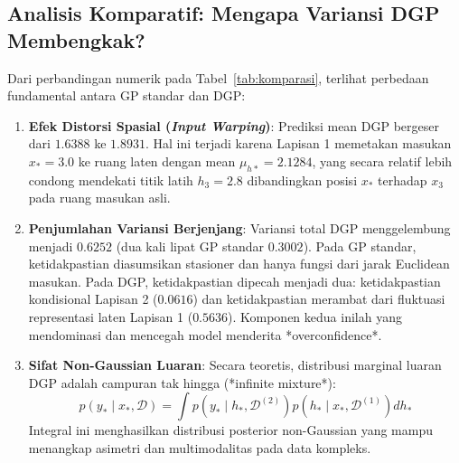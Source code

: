 \documentclass[11pt,a4paper]{article}
\begin{document}
\subsection{Analisis Komparatif: Mengapa Variansi DGP Membengkak?}
Dari perbandingan numerik pada Tabel~\ref{tab:komparasi}, terlihat perbedaan fundamental antara GP standar dan DGP:
\begin{enumerate}
    \item \textbf{Efek Distorsi Spasial (\textit{Input Warping})}: Prediksi mean DGP bergeser dari $1.6388$ ke $\mathbf{1.8931}$. Hal ini terjadi karena Lapisan 1 memetakan masukan $x_* = 3.0$ ke ruang laten dengan mean $\mu_{h*} = 2.1284$, yang secara relatif lebih condong mendekati titik latih $h_3 = 2.8$ dibandingkan posisi $x_*$ terhadap $x_3$ pada ruang masukan asli.
    \item \textbf{Penjumlahan Variansi Berjenjang}: Variansi total DGP menggelembung menjadi $\mathbf{0.6252}$ (dua kali lipat GP standar $0.3002$). Pada GP standar, ketidakpastian diasumsikan stasioner dan hanya fungsi dari jarak Euclidean masukan. Pada DGP, ketidakpastian dipecah menjadi dua: ketidakpastian kondisional Lapisan 2 ($0.0616$) dan ketidakpastian merambat dari fluktuasi representasi laten Lapisan 1 ($\mathbf{0.5636}$). Komponen kedua inilah yang mendominasi dan mencegah model menderita *overconfidence*.
    \item \textbf{Sifat Non-Gaussian Luaran}: Secara teoretis, distribusi marginal luaran DGP adalah campuran tak hingga (*infinite mixture*):
    \begin{equation}
        p(y_* \mid x_*, \mathcal{D}) = \int p\left(y_* \mid h_*, \mathcal{D}^{(2)}\right) p\left(h_* \mid x_*, \mathcal{D}^{(1)}\right) dh_*
    \end{equation}
    Integral ini menghasilkan distribusi posterior non-Gaussian yang mampu menangkap asimetri dan multimodalitas pada data kompleks.
\end{enumerate}
\end{document}
